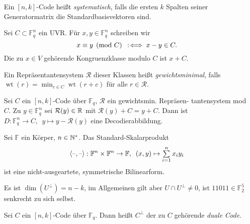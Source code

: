 \documentclass{cheat-sheet}
\newcommand{\F}{\mathbb{F}} %
\DeclareMathOperator{\wt}{wt} %
\newcommand{\scp}[2]{\left\langle #1, #2 \right\rangle} %
\begin{document}
\begin{defn}
  Ein $[n,k]$-Code heißt \emph{systematisch}, falls die ersten $k$ Spalten seiner Generatormatrix die Standardbasisvektoren sind.
\end{defn}


\begin{nota}
  Sei $C \subset \F_q^n$ ein UVR. Für $x, y \in \F_q^n$ schreiben wir
  \[ x \equiv y \pmod{C} \enspace:\!\iff x-y \in C. \]
  Die zu $x \in V$ gehörende Kongruenzklasse modulo $C$ ist $x + C$.
\end{nota}

\begin{defn}
  Ein Repräsentantensystem $\mathcal{R}$ dieser Klassen heißt \emph{gewichtsminimal}, falls $\wt(r) = \min_{c \in C} \wt(r+c)$ für alle $r \in \mathcal{R}$.
\end{defn}

\begin{satz}
  Sei $C$ ein $[n, k]$-Code über $\F_q$, $\mathcal{R}$ ein gewichtsmin. Repräsen- tantensystem mod $C$.
  Zu $y \in \F_q^n$ sei $\mathcal{R}(y) \in \mathbb{R}$ mit $\mathcal{R}(y) + C = y + C$.
  Dann ist $D : \F_q^n \to C, \enspace y \mapsto y - \mathcal{R}(y)$ eine Decodierabbildung.
\end{satz}




\begin{bem}
  Sei $\F$ ein Körper, $n \in \mathbb{N}^*$.
  Das Standard-Skalarprodukt
  \[
    \scp{\blank}{\blank} : \F^n \times \F^n \to \F,
    \enspace (x, y) \mapsto \sum_{i=1}^n x_i y_i
  \]
  ist eine nicht-ausgeartete, symmetrische Bilinearform.
\end{bem}


\begin{acht}
  Es ist $\dim(U^\perp) = n - k$, im Allgemeinen gilt aber $U \cap U^\perp \neq 0$, \zB{} ist $11011 \in \F_2^5$ senkrecht zu sich selbst.
\end{acht}

\begin{defn}
  Sei $C$ ein $[n,k]$-Code über $\F_q$.
  Dann heißt $C^\perp$ der zu $C$ gehörende \emph{duale Code}.
\end{defn}
\end{document}
